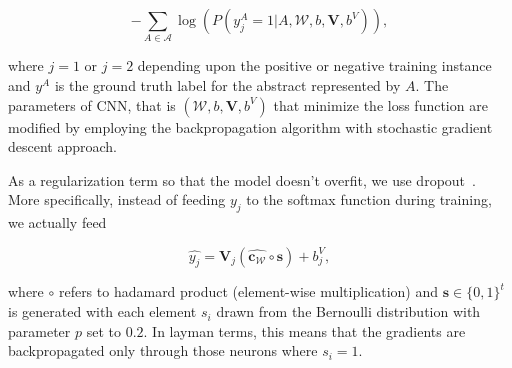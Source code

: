 \[- \sum_{A \in \mathcal{A}} \log(P(y_j^A = 1 | A, \mathcal{W}, b, \mathbf{V}, b^{V})),\]

where $j=1$ or $j=2$ depending upon the positive or negative training instance and $y^A$ is the ground truth label for the abstract represented by $A$. The parameters of CNN, that is $(\mathcal{W}, b, \mathbf{V}, b^{V})$ that minimize the loss function are modified by employing the backpropagation algorithm with stochastic gradient descent approach. 

As a regularization term so that the model doesn't overfit, we use dropout~\cite{srivastava2014dropout}. More specifically, instead of feeding $y_j$ to the softmax function during training, we actually feed 

\[ \hat{y_{j}} = \mathbf{V}_j( \mathbf{\hat{c_{\mathcal{W}}}} \circ \mathbf{s}) + b^{V}_j,
\]
 
where $\circ$ refers to hadamard product (element-wise multiplication) and $\mathbf{s} \in \{0,1\}^t$ is generated with each element $s_i$ drawn from the Bernoulli distribution with parameter $p$ set to $0.2$. In layman terms, this means that the gradients are backpropagated only through those neurons where $s_i = 1$. 





